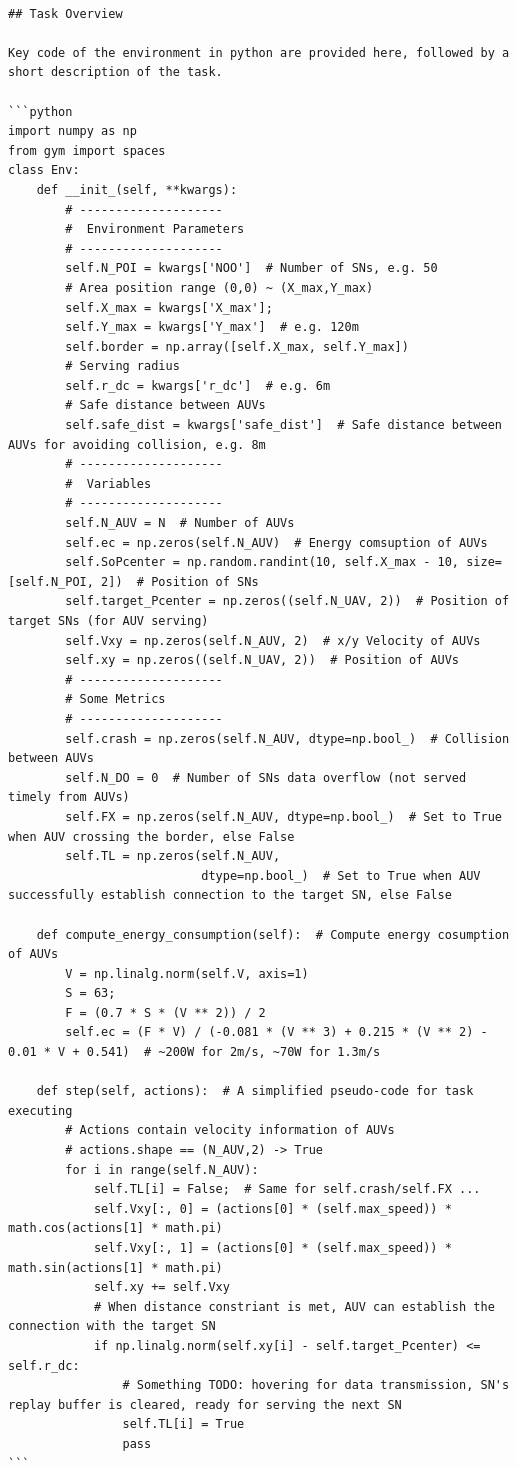 \documentclass{article}
\begin{document}
\begin{verbatim}

## Task Overview

Key code of the environment in python are provided here, followed by a short description of the task.

```python
import numpy as np
from gym import spaces
class Env:
    def __init_(self, **kwargs):
        # --------------------
        #  Environment Parameters
        # --------------------
        self.N_POI = kwargs['NOO']  # Number of SNs, e.g. 50
        # Area position range (0,0) ~ (X_max,Y_max)
        self.X_max = kwargs['X_max'];
        self.Y_max = kwargs['Y_max']  # e.g. 120m
        self.border = np.array([self.X_max, self.Y_max])
        # Serving radius
        self.r_dc = kwargs['r_dc']  # e.g. 6m
        # Safe distance between AUVs
        self.safe_dist = kwargs['safe_dist']  # Safe distance between AUVs for avoiding collision, e.g. 8m
        # --------------------
        #  Variables
        # --------------------
        self.N_AUV = N  # Number of AUVs
        self.ec = np.zeros(self.N_AUV)  # Energy comsuption of AUVs
        self.SoPcenter = np.random.randint(10, self.X_max - 10, size=[self.N_POI, 2])  # Position of SNs
        self.target_Pcenter = np.zeros((self.N_UAV, 2))  # Position of target SNs (for AUV serving)
        self.Vxy = np.zeros(self.N_AUV, 2)  # x/y Velocity of AUVs
        self.xy = np.zeros((self.N_UAV, 2))  # Position of AUVs
        # --------------------
        # Some Metrics
        # --------------------
        self.crash = np.zeros(self.N_AUV, dtype=np.bool_)  # Collision between AUVs
        self.N_DO = 0  # Number of SNs data overflow (not served timely from AUVs)
        self.FX = np.zeros(self.N_AUV, dtype=np.bool_)  # Set to True when AUV crossing the border, else False
        self.TL = np.zeros(self.N_AUV,
                           dtype=np.bool_)  # Set to True when AUV successfully establish connection to the target SN, else False

    def compute_energy_consumption(self):  # Compute energy cosumption of AUVs
        V = np.linalg.norm(self.V, axis=1)
        S = 63;
        F = (0.7 * S * (V ** 2)) / 2
        self.ec = (F * V) / (-0.081 * (V ** 3) + 0.215 * (V ** 2) - 0.01 * V + 0.541)  # ~200W for 2m/s, ~70W for 1.3m/s

    def step(self, actions):  # A simplified pseudo-code for task executing
        # Actions contain velocity information of AUVs
        # actions.shape == (N_AUV,2) -> True
        for i in range(self.N_AUV):
            self.TL[i] = False;  # Same for self.crash/self.FX ...
            self.Vxy[:, 0] = (actions[0] * (self.max_speed)) * math.cos(actions[1] * math.pi)
            self.Vxy[:, 1] = (actions[0] * (self.max_speed)) * math.sin(actions[1] * math.pi)
            self.xy += self.Vxy
            # When distance constriant is met, AUV can establish the connection with the target SN
            if np.linalg.norm(self.xy[i] - self.target_Pcenter) <= self.r_dc:
                # Something TODO: hovering for data transmission, SN's replay buffer is cleared, ready for serving the next SN
                self.TL[i] = True
                pass
```


\end{verbatim}
\end{document}
